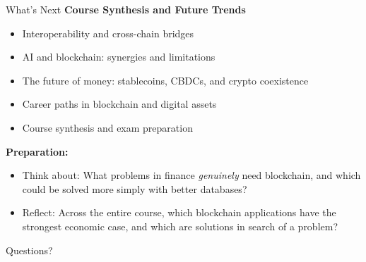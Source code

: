 \documentclass[10pt]{beamer}
\begin{document}
\begin{frame}{What's Next}
  \textbf{Course Synthesis and Future Trends}
  \begin{itemize}
    \item Interoperability and cross-chain bridges
    \item AI and blockchain: synergies and limitations
    \item The future of money: stablecoins, CBDCs, and crypto coexistence
    \item Career paths in blockchain and digital assets
    \item Course synthesis and exam preparation
  \end{itemize}
  
  \vspace{1em}
  \textbf{Preparation:}
  \begin{itemize}
    \item Think about: What problems in finance \textit{genuinely} need blockchain, and which could be solved more simply with better databases?
    \item Reflect: Across the entire course, which blockchain applications have the strongest economic case, and which are solutions in search of a problem?
  \end{itemize}
\end{frame}

\begin{frame}[plain]
  \vfill
  \begin{center}
    {\Large Questions?}
  \end{center}
  \vfill
\end{frame}
\end{document}
